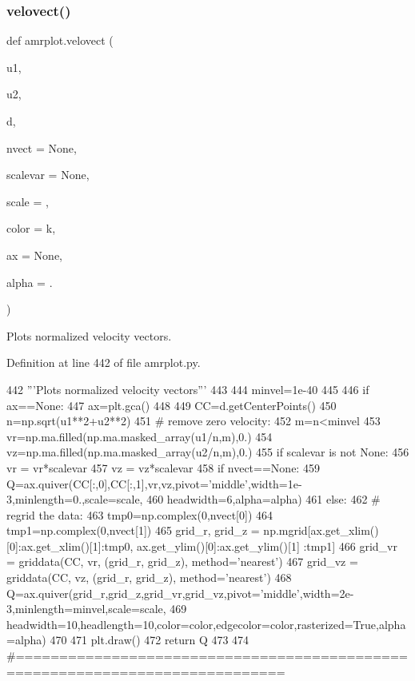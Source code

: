 \subsubsection{\texorpdfstring{velovect()}{velovect()}}
{\footnotesize\ttfamily def amrplot.\+velovect (\begin{DoxyParamCaption}\item[{}]{u1,  }\item[{}]{u2,  }\item[{}]{d,  }\item[{}]{nvect = {\ttfamily None},  }\item[{}]{scalevar = {\ttfamily None},  }\item[{}]{scale = {},  }\item[{}]{color = {\ttfamily \textquotesingle{}k\textquotesingle{}},  }\item[{}]{ax = {\ttfamily None},  }\item[{}]{alpha = {.} }\end{DoxyParamCaption})}



Plots normalized velocity vectors. 



Definition at line 442 of file amrplot.\+py.


\begin{DoxyCode}
442     \textcolor{stringliteral}{'''Plots normalized velocity vectors'''}
443 
444     minvel=1e-40
445 
446     \textcolor{keywordflow}{if} ax==\textcolor{keywordtype}{None}:
447         ax=plt.gca()
448 
449     CC=d.getCenterPoints()
450     n=np.sqrt(u1**2+u2**2)
451     \textcolor{comment}{# remove zero velocity:}
452     m=n<minvel
453     vr=np.ma.filled(np.ma.masked\_array(u1/n,m),0.)
454     vz=np.ma.filled(np.ma.masked\_array(u2/n,m),0.)
455     \textcolor{keywordflow}{if} scalevar \textcolor{keywordflow}{is} \textcolor{keywordflow}{not} \textcolor{keywordtype}{None}:
456         vr = vr*scalevar
457         vz = vz*scalevar
458     \textcolor{keywordflow}{if} nvect==\textcolor{keywordtype}{None}:
459         Q=ax.quiver(CC[:,0],CC[:,1],vr,vz,pivot=\textcolor{stringliteral}{'middle'},width=1e-3,minlength=0.,scale=scale,
460                     headwidth=6,alpha=alpha)
461     \textcolor{keywordflow}{else}:
462         \textcolor{comment}{# regrid the data:}
463         tmp0=np.complex(0,nvect[0])
464         tmp1=np.complex(0,nvect[1])
465         grid\_r, grid\_z = np.mgrid[ax.get\_xlim()[0]:ax.get\_xlim()[1]:tmp0, ax.get\_ylim()[0]:ax.get\_ylim()[1]
      :tmp1]
466         grid\_vr = griddata(CC, vr, (grid\_r, grid\_z), method=\textcolor{stringliteral}{'nearest'})
467         grid\_vz = griddata(CC, vz, (grid\_r, grid\_z), method=\textcolor{stringliteral}{'nearest'})
468         Q=ax.quiver(grid\_r,grid\_z,grid\_vr,grid\_vz,pivot=\textcolor{stringliteral}{'middle'},width=2e-3,minlength=minvel,scale=scale,
469                     headwidth=10,headlength=10,color=color,edgecolor=color,rasterized=\textcolor{keyword}{True},alpha=alpha)
470 
471     plt.draw()
472     \textcolor{keywordflow}{return} Q     
473 
474 \textcolor{comment}{#=============================================================================}
\end{DoxyCode}


